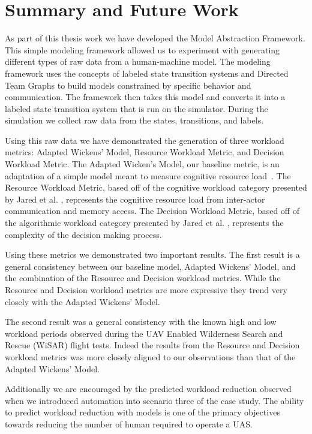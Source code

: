 \chapter{Summary and Future Work} \label{ch:summary}

As part of this thesis work we have developed the Model Abstraction Framework.  This simple modeling framework allowed us to experiment with generating different types of raw data from a human-machine model.  The modeling framework uses the concepts of labeled state transition systems and Directed Team Graphs to build models constrained by specific behavior and communication.  The framework then takes this model and converts it into a labeled state transition system that is run on the simulator.  During the simulation we collect raw data from the states, transitions, and labels.

Using this raw data we have demonstrated the generation of three workload metrics: Adapted Wickens' Model, Resource Workload Metric, and Decision Workload Metric.  The Adapted Wicken's Model, our baseline metric, is an adaptation of a simple model meant to measure cognitive resource load~\cite{wickens2002multiple}.  The Resource Workload Metric, based off of the cognitive workload category presented by Jared et al. \cite{moore2014modeling}, represents the cognitive resource load from inter-actor communication and memory access.  The Decision Workload Metric, based off of the algorithmic workload category presented by Jared et al. \cite{moore2014modeling}, represents the complexity of the decision making process.

Using these metrics we demonstrated two important results.  The first result is a general consistency between our baseline model, Adapted Wickens' Model, and the combination of the Resource and Decision workload metrics.  While the Resource and Decision workload metrics are more expressive they trend very closely with the Adapted Wickens' Model.

The second result was a general consistency with the known high and low workload periods observed during the UAV Enabled Wilderness Search and Rescue (WiSAR) flight tests.  Indeed the results from the Resource and Decision workload metrics was more closely aligned to our observations than that of the Adapted Wickens' Model.

Additionally we are encouraged by the predicted workload reduction observed when we introduced automation into scenario three of the case study.  The ability to predict workload reduction with models is one of the primary objectives towards reducing the number of human required to operate a UAS.

